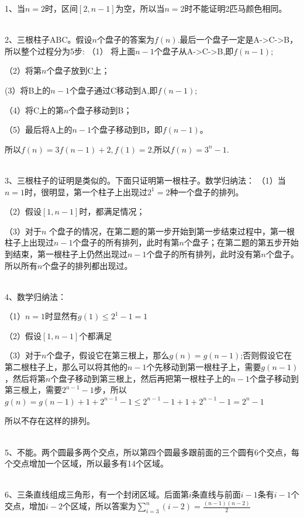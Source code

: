 \documentclass[onecolumn]{article}
\begin{document}
1、当$n=2$时，区间$[2,n-1]$为空，所以当$n=2$时不能证明2匹马颜色相同。\par
~\\
2、三根柱子ABC。假设$n$个盘子的答案为$f(n)$.最后一个盘子一定是A->C->B，所以整个过程分为5步:
（1） 将上面$n-1$个盘子从A->C->B,即$f(n-1)$; \par 
（2）将第$n$个盘子放到C上；  \par 
 (3）将B上的$n-1$个盘子通过C移动到A,即$f(n-1)$; \par 
 （4）将C上的第$n$个盘子移动到B； \par 
 （5）最后将A上的$n-1$个盘子移动到B，即$f(n-1)$。 \par 
 所以$f(n)=3f(n-1)+2, f(1)=2$,所以$f(n)=3^{n}-1$. \par 
~\\

3、三根柱子的证明是类似的。下面只证明第一根柱子。数学归纳法：
（1）当$n=1$时，很明显，第一个柱子上出现过$2^1=2$种一个盘子的排列。 \par 
（2）假设$[1,n-1]$时，都满足情况； \par 
（3）对于$n$ 个盘子的情况，在第二题的第一步开始到第一步结束过程中，第一根柱子上出现过$n-1$个盘子的所有排列，此时有第$n$个盘子；在第二题的第五步开始到结束，第一根柱子上仍然出现过$n-1$个盘子的所有排列，此时没有第$n$个盘子。所以所有$n$个盘子的排列都出现过。
\par ~\\

4、数学归纳法：\par
（1）$n=1$时显然有$g(1) \le 2^{1}-1=1$ \par 
（2）假设$[1,n-1]$个都满足 \par 
（3）对于$n$个盘子，假设它在第三根上，那么$g(n)=g(n-1)$;否则假设它在第二根柱子上，那么可以将其他的$n-1$个先移动到第一根柱子上，需要$g(n-1)$，然后将第$n$个盘子移动到第三根上，然后再把第一根柱子上的$n-1$个盘子移动到第三根上，需要$2^{n-1}-1$步，所以$g(n)=g(n-1)+1+2^{n-1}-1 \le 2^{n-1}-1+1+2^{n-1}-1=2^{n}-1$ \par
所以不存在这样的排列。
\par ~\\

5、不能。两个圆最多两个交点，所以第四个圆最多跟前面的三个圆有6个交点，每个交点增加一个区域，所以最多有14个区域。
\par ~\\
6、三条直线组成三角形，有一个封闭区域。后面第$i$条直线与前面$i-1$条有$i-1$个交点，增加$i-2$个区域，所以答案为$\sum_{i=3}^{n}(i-2)=\frac{(n-1)(n-2)}{2}$
\par ~\\
\end{document}
